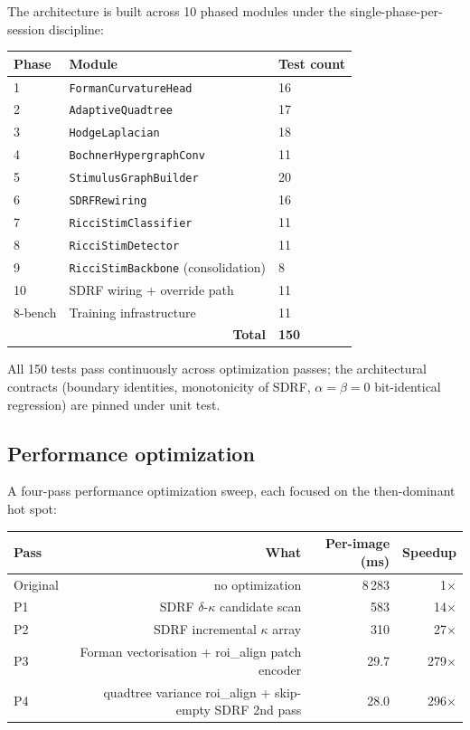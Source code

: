 \documentclass[11pt,a4paper]{article}
\begin{document}
The architecture is built across 10 phased modules under the
single-phase-per-session discipline:

\begin{center}
\begin{tabular}{lll}
\toprule
Phase & Module & Test count \\
\midrule
1 & \texttt{FormanCurvatureHead} & 16 \\
2 & \texttt{AdaptiveQuadtree} & 17 \\
3 & \texttt{HodgeLaplacian} & 18 \\
4 & \texttt{BochnerHypergraphConv} & 11 \\
5 & \texttt{StimulusGraphBuilder} & 20 \\
6 & \texttt{SDRFRewiring} & 16 \\
7 & \texttt{RicciStimClassifier} & 11 \\
8 & \texttt{RicciStimDetector} & 11 \\
9 & \texttt{RicciStimBackbone} (consolidation) & 8 \\
10 & SDRF wiring + override path & 11 \\
8-bench & Training infrastructure & 11 \\
\midrule
\multicolumn{2}{r}{\textbf{Total}} & \textbf{150} \\
\bottomrule
\end{tabular}
\end{center}

All 150 tests pass continuously across optimization passes; the
architectural contracts (boundary identities, monotonicity of
SDRF, $\alpha = \beta = 0$ bit-identical regression) are pinned
under unit test.

\subsection{Performance optimization}

A four-pass performance optimization sweep, each focused on the
then-dominant hot spot:

\begin{center}
\begin{tabular}{lrrr}
\toprule
Pass & What & Per-image (ms) & Speedup \\
\midrule
Original & no optimization & 8\,283 & 1$\times$ \\
P1 & SDRF $\delta$-$\kappa$ candidate scan & 583 & 14$\times$ \\
P2 & SDRF incremental $\kappa$ array & 310 & 27$\times$ \\
P3 & Forman vectorisation + roi\_align patch encoder & 29.7 & 279$\times$ \\
P4 & quadtree variance roi\_align + skip-empty SDRF 2nd pass & 28.0 & 296$\times$ \\
\bottomrule
\end{tabular}
\end{center}
\end{document}

